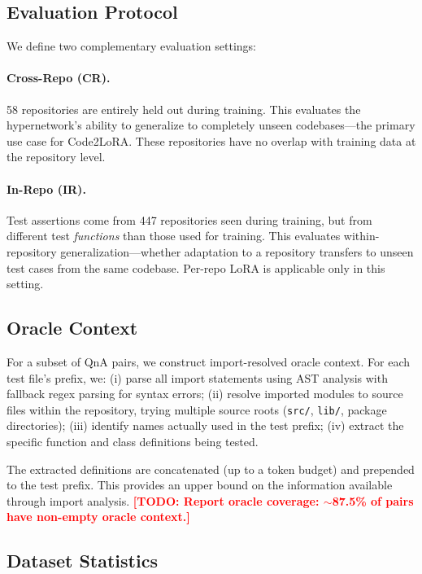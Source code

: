 \documentclass[11pt]{article}
\newcommand{\method}{Code2LoRA}
\newcommand{\todo}[1]{\textcolor{red}{\textbf{[TODO: #1]}}}
\begin{document}
\subsection{Evaluation Protocol}

We define two complementary evaluation settings:

\paragraph{Cross-Repo (CR).}
58 repositories are entirely held out during training.
This evaluates the hypernetwork's ability to generalize to completely unseen codebases---the primary use case for \method{}.
These repositories have no overlap with training data at the repository level.

\paragraph{In-Repo (IR).}
Test assertions come from 447 repositories seen during training, but from different test \emph{functions} than those used for training.
This evaluates within-repository generalization---whether adaptation to a repository transfers to unseen test cases from the same codebase.
Per-repo LoRA is applicable only in this setting.

\subsection{Oracle Context}
\label{sec:oracle}

For a subset of QnA pairs, we construct import-resolved oracle context.
For each test file's prefix, we:
(i) parse all import statements using AST analysis with fallback regex parsing for syntax errors;
(ii) resolve imported modules to source files within the repository, trying multiple source roots (\texttt{src/}, \texttt{lib/}, package directories);
(iii) identify names actually used in the test prefix;
(iv) extract the specific function and class definitions being tested.

The extracted definitions are concatenated (up to a token budget) and prepended to the test prefix.
This provides an upper bound on the information available through import analysis.
\todo{Report oracle coverage: $\sim$87.5\% of pairs have non-empty oracle context.}

\subsection{Dataset Statistics}
\end{document}
